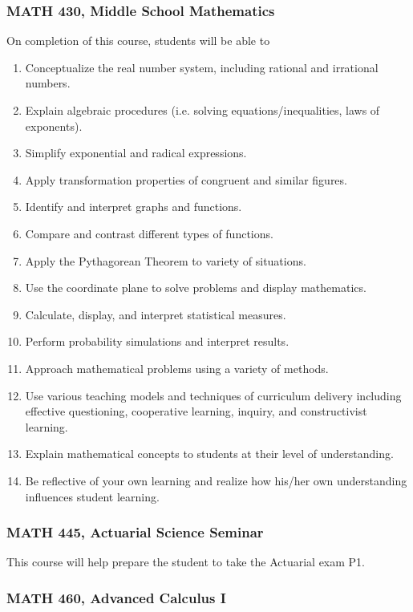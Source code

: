 \documentclass[11pt]{article}
\newenvironment{alphalist}{
\begin{enumerate}[label=(\arabic*),widest=107 ,leftmargin=25pt, itemsep=0pt]}
{\end{enumerate}}
\begin{document}
\subsubsection*{MATH 430,  Middle School Mathematics}

On completion of this course, students will be able to 
\begin{alphalist}
\item Conceptualize the real number system, including rational and irrational numbers. 
\item Explain algebraic procedures (i.e. solving equations/inequalities, laws of exponents). 
\item Simplify exponential and radical expressions. 
\item Apply transformation properties of congruent and similar figures. 
\item Identify and interpret graphs and functions. 
\item Compare and contrast different types of functions. 
\item Apply the Pythagorean Theorem to variety of situations. 
\item Use the coordinate plane to solve problems and display mathematics. 
\item Calculate, display, and interpret statistical measures. 
\item Perform probability simulations and interpret results. 
\item Approach mathematical problems using a variety of methods. 
\item Use various teaching models and techniques of curriculum delivery including effective questioning, cooperative learning, inquiry, and constructivist learning. 
\item Explain mathematical concepts to students at their level of understanding. 
\item Be reflective of your own learning and realize how his/her own understanding influences student learning.
\end{alphalist}

\subsubsection*{MATH 445, Actuarial Science Seminar}

This course will help prepare the student to take the Actuarial exam P1.

\subsubsection*{MATH 460, Advanced Calculus I}
\end{document}
